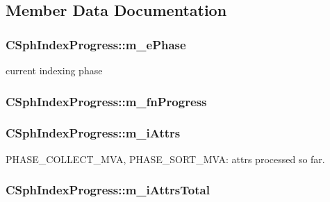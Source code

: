 \subsection{Member Data Documentation}
\hypertarget{structCSphIndexProgress_acf27cb1ca0bc036494f1e798bdb97483}{
\subsubsection[{m\-\_\-e\-Phase}]{ C\-Sph\-Index\-Progress\-::m\-\_\-e\-Phase}}\label{structCSphIndexProgress_acf27cb1ca0bc036494f1e798bdb97483}


current indexing phase 

\hypertarget{structCSphIndexProgress_a4639ab9f99975ea875afd66c3a3514c3}{
\subsubsection[{m\-\_\-fn\-Progress}]{ C\-Sph\-Index\-Progress\-::m\-\_\-fn\-Progress}}\label{structCSphIndexProgress_a4639ab9f99975ea875afd66c3a3514c3}
\hypertarget{structCSphIndexProgress_a0ece283c0e0643c6dbc9c16d27cd2b5d}{
\subsubsection[{m\-\_\-i\-Attrs}]{ C\-Sph\-Index\-Progress\-::m\-\_\-i\-Attrs}}\label{structCSphIndexProgress_a0ece283c0e0643c6dbc9c16d27cd2b5d}


P\-H\-A\-S\-E\-\_\-\-C\-O\-L\-L\-E\-C\-T\-\_\-\-M\-V\-A, P\-H\-A\-S\-E\-\_\-\-S\-O\-R\-T\-\_\-\-M\-V\-A\-: attrs processed so far. 

\hypertarget{structCSphIndexProgress_a4669529ab4d9ae7ccae6554614eda98b}{
\subsubsection[{m\-\_\-i\-Attrs\-Total}]{ C\-Sph\-Index\-Progress\-::m\-\_\-i\-Attrs\-Total}}\label{structCSphIndexProgress_a4669529ab4d9ae7ccae6554614eda98b}


